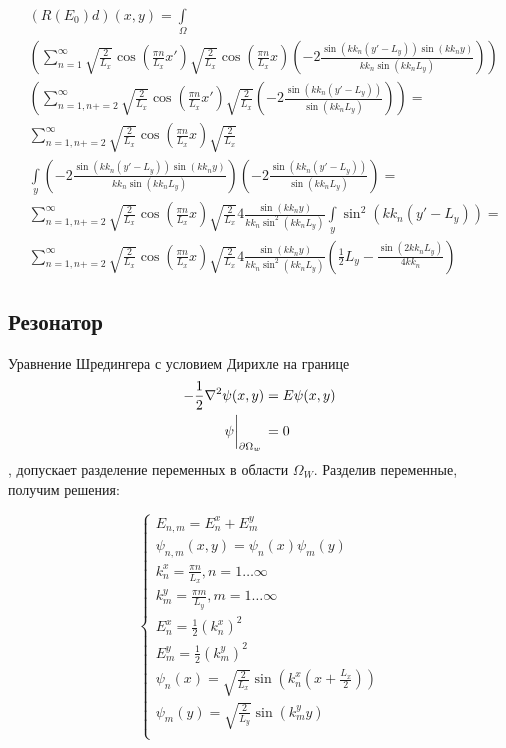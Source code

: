 \begin{align*}
& (R(E_0) d)(x, y) = \int\limits_\Omega \\
& \left(
\sum\limits_{n = 1}^\infty
\sqrt{\frac{2}{L_x}} \cos(\frac{\pi n}{L_x} x') \sqrt{\frac{2}{L_x}} \cos(\frac{\pi n}{L_x} x)
\left(-2\frac{\sin(kk_n(y' - L_y)) \sin(kk_n y)}{kk_n \sin(kk_n L_y)}\right)
\right) \\
& \left(
\sum\limits_{n = 1, n += 2}^\infty
\sqrt{\frac{2}{L_x}} \cos(\frac{\pi n}{L_x} x') \sqrt{\frac{2}{L_x}}
\left(-2\frac{\sin(kk_n(y' - L_y))}{\sin(kk_n L_y)}\right)
\right) = \\
& \sum\limits_{n = 1, n += 2}^\infty
\sqrt{\frac{2}{L_x}} \cos(\frac{\pi n}{L_x} x) \sqrt{\frac{2}{L_x}}\\
& \int\limits_y  \left(-2\frac{\sin(kk_n(y' - L_y)) \sin(kk_n y)}{kk_n \sin(kk_n L_y)}\right)
\left(-2\frac{\sin(kk_n(y' - L_y))}{\sin(kk_n L_y)}\right) = \\
& \sum\limits_{n = 1, n += 2}^\infty
\sqrt{\frac{2}{L_x}} \cos(\frac{\pi n}{L_x} x) \sqrt{\frac{2}{L_x}} 4 \frac{\sin(kk_n y) }{kk_n \sin^2(kk_n L_y)}\int\limits_y  \sin^2(kk_n(y' - L_y)) = \\
& \sum\limits_{n = 1, n += 2}^\infty
\sqrt{\frac{2}{L_x}} \cos(\frac{\pi n}{L_x} x) \sqrt{\frac{2}{L_x}} 4 \frac{\sin(kk_n y) }{kk_n \sin^2(kk_n L_y)}
\left( \frac{1}{2} L_y - \frac{\sin(2 kk_n L_y)}{4 kk_n} \right)
\end{align*}


\subsection{Резонатор}
Уравнение Шредингера с условием Дирихле на границе
\begin{align*}
- \frac{1}{2}\laplacian \psi(x, y) &= E \psi(x, y) \\
\eval{\psi}_{\partial \Omega_w}{} &= 0
\end{align*}
, допускает разделение переменных в области $\Omega_W$. Разделив переменные, получим решения:

\[
\begin{cases}
E_{n,m} = E_n^x + E_m^y \\
\psi_{n, m}(x, y) = \psi_n(x) \psi_m(y) \\
k_n^x = \frac{\pi n}{L_x}, n = 1 \dots \infty \\
k_m^y = \frac{\pi m}{L_y}, m = 1 \dots \infty \\
E_n^x = \frac{1}{2} (k_n^x)^2 \\
E_m^y = \frac{1}{2} (k_m^y)^2 \\
\psi_n(x) = \sqrt{\frac{2}{L_x}} \sin(k_n^x (x + \frac{L_x}{2}))\\
\psi_m(y) = \sqrt{\frac{2}{L_y}} \sin(k_m^y y) \\
\end{cases}
\]

